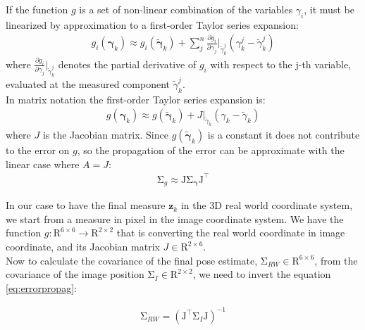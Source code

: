 If the function $g$ is a set of non-linear combination of the variables $\gamma_i$,  it must be linearized by approximation to a first-order Taylor series expansion:
\begin{align}
g_{i}(\boldsymbol{\gamma}_{k}) \approx g_{i}(\tilde{\boldsymbol{\gamma}}_{k})+\sum _{j}^{n}{\frac  {\partial g_{i}}{\partial {\gamma_{j}}}}\Big|_{\tilde{\gamma}_k^{j}}(\gamma_k^{j}-\tilde{\gamma}_k^{j})
\end{align}
where ${\frac  {\partial g_{i}}{\partial {\gamma_{j}}}}\Big|_{\tilde{\gamma}_k^{j}}$ denotes the partial derivative of $g_i$ with respect to the j-th variable, evaluated at the measured component $\tilde{\gamma}_k^{j}$.\\
In matrix notation the first-order Taylor series expansion is:
\begin{align}
g(\boldsymbol{\gamma}_{k}) \approx g(\tilde{\boldsymbol{\gamma}}_{k})+J\Big|_{\tilde{\gamma}_k}(\gamma_k-\tilde{\gamma}_k)
\end{align}
where $J$ is the Jacobian matrix. Since $g(\tilde{\boldsymbol{\gamma}}_{k})$ is a constant it does not contribute to the error on $g$, so the propagation of the error can be approximate with the linear case where $A = J$:
\begin{align}
{\displaystyle \mathrm {\Sigma }_g\approx \mathrm {J} \mathrm {\Sigma }_{\boldsymbol{\gamma}}\mathrm {J} ^{\top}} 
\label{eq:errorpropag}
\end{align}

In our case to have the final measure $\boldsymbol{z}_k$  in the 3D real world coordinate system, we start from a measure in pixel in the image coordinate system. We have the function $g : \mathrm{R}^{6 \times 6} \to \mathrm{R}^{2 \times 2} $ that is converting the real world coordinate in image coordinate, and its Jacobian matrix $J \in \mathrm{R}^{2 \times 6} $.\\
Now to calculate the covariance of the final pose estimate, $\mathrm {\Sigma }_{RW} \in \mathrm{R}^{6 \times 6} $, from the covariance of the image position  $\mathrm {\Sigma }_{I} \in \mathrm{R}^{2 \times 2} $, we need to invert the equation \ref{eq:errorpropag}:

\begin{align}
{\displaystyle \mathrm{\Sigma}_{RW} = ( \mathrm{J}^{\top} \mathrm{\Sigma }_{I} \mathrm{J})^{-1} } 
\label{eq:errorpropag}
\end{align}

